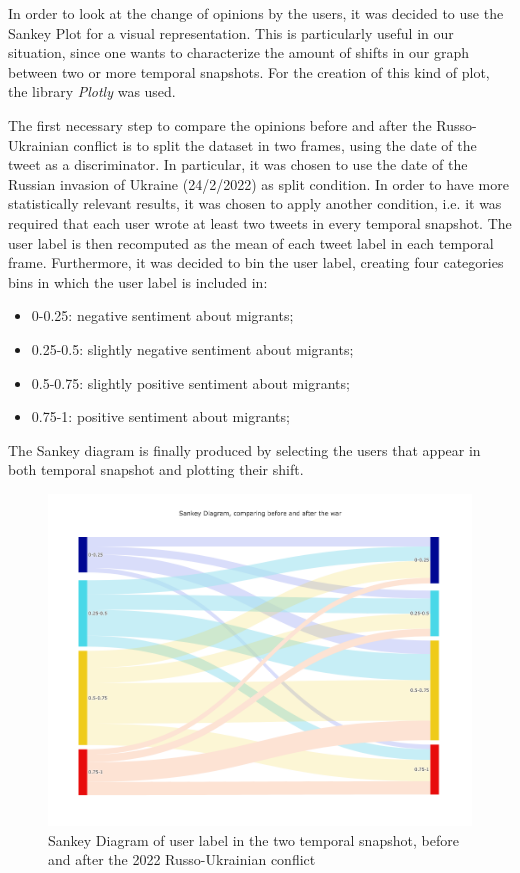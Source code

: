 \documentclass[sigchi]{acmart}
\begin{document}
In order to look at the change of opinions by the users, it was decided to use the Sankey Plot for a visual representation. This is particularly useful in our situation, since one wants to characterize the amount of shifts in our graph between two or more temporal snapshots. For the creation of this kind of plot, the library \textit{Plotly}\cite{plotly} was used.

The first necessary step to compare the opinions before and after the Russo-Ukrainian conflict is to split the dataset in two frames, using the date of the tweet as a discriminator. In particular, it was chosen to use the date of the Russian invasion of Ukraine (24/2/2022) as split condition. In order to have more statistically relevant results, it was chosen to apply another condition, i.e. it was required that each user wrote at least two tweets in every temporal snapshot. The user label is then recomputed as the mean of each tweet label in each temporal frame. Furthermore, it was decided to bin the user label, creating four categories bins in which the user label is included in:

\begin{itemize}
    \item 0-0.25: negative sentiment about migrants;
    \item 0.25-0.5: slightly negative sentiment about migrants;
    \item 0.5-0.75: slightly positive sentiment about migrants;
    \item 0.75-1: positive sentiment about migrants;
\end{itemize}

The Sankey diagram is finally produced by selecting the users that appear in both temporal snapshot and plotting their shift.

\begin{figure}[h]
    \centering
    \includegraphics[width=0.9\columnwidth]{report/img/Sankey_before_after_2tweet.png}
    \caption{Sankey Diagram of user label in the two temporal snapshot, before and after the 2022 Russo-Ukrainian conflict}
    \label{fig:sankey_before_after}
\end{figure}
\end{document}
